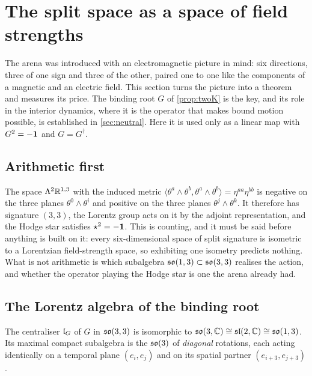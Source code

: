

\section{The split space as a space of field strengths}
\label{sec:emfield}

The arena was introduced with an electromagnetic picture in mind: six directions, three of one sign and three of the other, paired
one to one like the components of a magnetic and an electric field. This section turns the picture into a theorem and measures its
price. The binding root $G$ of \cref{prop:twoK} is the key, and its role in the interior dynamics, where it is the operator that
makes bound motion possible, is established in \cref{sec:neutral}. Here it is used only as a linear map with $G^2=-\mathbf 1$ and
$G=G^\dagger$.

\subsection{Arithmetic first}

The space $\Lambda^2\mathbb{R}^{1,3}$ with the induced metric $\langle\theta^a\wedge\theta^b,\theta^a\wedge\theta^b\rangle=\eta^{aa}\eta^{bb}$ is
negative on the three planes $\theta^0\wedge\theta^i$ and positive on the three planes $\theta^j\wedge\theta^k$. It therefore has
signature $(3,3)$, the Lorentz group acts on it by the adjoint representation, and the Hodge star satisfies $\star^2=-\mathbf 1$. This is
counting, and it must be said before anything is built on it: every six-dimensional space of split signature is isometric to a
Lorentzian field-strength space, so exhibiting one isometry predicts nothing. What is not arithmetic is which subalgebra
$\mathfrak{so}(1,3)\subset\mathfrak{so}(3,3)$ realises the action, and whether the operator playing the Hodge star is one the arena already had.

\subsection{The Lorentz algebra of the binding root}

\begin{theorem}
\label{thm:GLorentz}
The centraliser $\mathfrak l_G$ of $G$ in $\mathfrak{so}(3,3)$ is isomorphic to $\mathfrak{so}(3,\mathbb{C})\cong\mathfrak{sl}(2,\mathbb{C})\cong\mathfrak{so}(1,3)$. Its maximal compact
subalgebra is the $\mathfrak{so}(3)$ of \emph{diagonal} rotations, each acting identically on a temporal plane $(e_i,e_j)$ and on its spatial
partner $(e_{i+3},e_{j+3})$.
\end{theorem}

